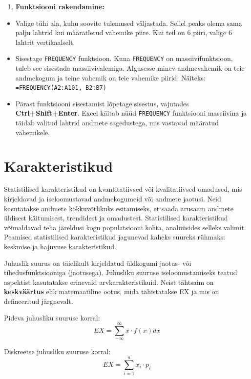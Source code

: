 \documentclass[
]{book}
\providecommand{\tightlist}{%
  \setlength{\itemsep}{0pt}\setlength{\parskip}{0pt}}
\begin{document}
\begin{enumerate}
\def\labelenumi{\arabic{enumi}.}
\setcounter{enumi}{1}
\tightlist
\item
  \textbf{Funktsiooni rakendamine:}
\end{enumerate}

\begin{itemize}
\tightlist
\item
  Valige tühi ala, kuhu soovite tulemused väljastada. Sellel peaks olema sama palju lahtrid kui määratletud vahemike piire. Kui teil on 6 piiri, valige 6 lahtrit vertikaalselt.
\item
  Sisestage \texttt{FREQUENCY} funktsioon. Kuna \texttt{FREQUENCY} on massiivifunktsioon, tuleb see sisestada massiivivalemiga. Algusesse minev andmevahemik on teie andmekogum ja teine vahemik on teie vahemike piirid.
  Näiteks: \texttt{=FREQUENCY(A2:A101,\ B2:B7)}
\item
  Pärast funktsiooni sisestamist lõpetage sisestus, vajutades \textbf{Ctrl+Shift+Enter}. Excel käitab nüüd \texttt{FREQUENCY} funktsiooni massiivina ja täidab valitud lahtrid andmete sagedustega, mis vastavad määratud vahemikele.
\end{itemize}

\chapter{Karakteristikud}\label{karakteristikud}

Statistilised karakteristikud on kvantitatiivsed või kvalitatiivsed omadused, mis kirjeldavad ja iseloomustavad andmekogumeid või andmete jaotusi. Neid kasutatakse andmete kokkuvõtlikuks esitamiseks, et saada arusaam andmete üldisest käitumisest, trendidest ja omadustest. Statistilised karakteristikud võimaldavad teha järeldusi kogu populatsiooni kohta, analüüsides selleks valimit. Peamised statistilised karakteristikud jagunevad kaheks suureks rühmaks: keskmise ja hajuvuse karakteristikud.

Juhuslik suurus on täielikult kirjeldatud üldkogumi jaotus- või tihedusfunktsiooniga (jaotusega). Juhusliku suuruse iseloomustamiseks teatud aspektist kasutatakse erinevaid arvkarakteristikuid. Neist tähtsaim on \textbf{keskväärtus} ehk matemaatiline ootus, mida tähistatakse EX ja mis on defineeritud järgnevalt.

Pideva juhusliku suuruse korral:
\[EX = \sum_{-\infty}^{\infty} x \cdot f(x) dx\]

Diskreetse juhusliku suuruse korral:
\[EX = \sum_{i=1}^{n} x_i \cdot p_i\]
\end{document}
